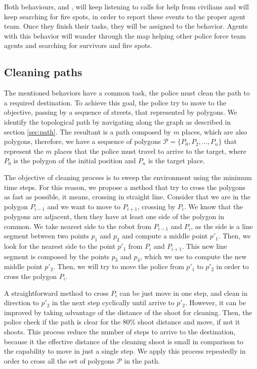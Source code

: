 Both behaviours,  and , will keep listening to calls for help from civilians and will keep searching for fire spots, in order to report these events to the proper agent team. Once they finish their tasks, they will be assigned to the  behavior. Agents with this behavior will wander through the map helping other police force team agents and searching for survivors and fire spots.

\subsection{Cleaning paths}
The mentioned behaviors have a common task, the police must clean the path to a required destination.
To achieve this goal, the police try to move to the objective, passing by a sequence of streets, that represented by polygons. We identify the topological path by navigating along the graph as described in section \ref{sec:path}. The resultant is a path composed by $m$ places, which are also polygons, therefore, we have a sequence of polygons $\mathcal{P} = \{P_0, P_2, ..., P_n \}$ that represent the $m$ places that the police must travel to arrive to the target, where $P_0$ is the polygon of the initial position and $P_n$ is the target place.

The objective of cleaning process is to sweep the environment using the minimum time steps.
For this reason, we propose a method that try to cross the polygons as fast as possible, it means, crossing in straight line.
Consider that we are in the polygon $P_{i-1}$ and we want to move to  $P_{i+1}$, crossing by  $P_{i}$.
We know that the polygons are adjacent, then they have at least one side of the polygon in common.
We take nearest side to the robot from $P_{i-1}$ and $P_{i}$, as the side is a line segment between two points $p_1$ and $p_2$ and compute a middle point $p'_1$.
Then, we look for the nearest side to the point $p'_1$ from $P_{i}$ and $P_{i+1}$. This new line segment is composed by the points $p_3$ and $p_4$, which we use to compute the new middle point $p'_2$. Then, we will try to move the police from  $p'_1$ to $p'_2$ in order to cross the polygon $P_{i}$.

A straightforward method to cross $P_{i}$ can be just move in one step, and clean in direction to $p'_2$ in the next step cyclically until arrive to $p'_2$. However,
it can be improved by taking advantage of the distance of the shoot for cleaning.
Then, the police check if the path is clear for the $80\%$ shoot distance and move, if not it shoots. This process reduce the number of steps to arrive to the destination, because it the effective distance of the cleaning shoot is small in comparison to the capability to move in just a single step.
We apply this process repeatedly in order to cross all the set of polygons $\mathcal{P}$ in the path.


